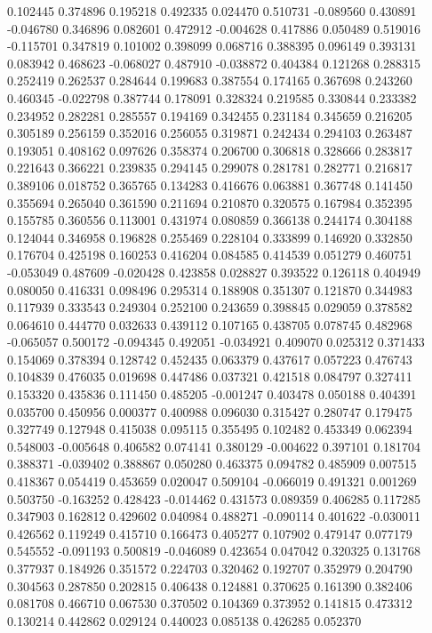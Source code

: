 0.102445
0.374896
0.195218
0.492335
0.024470
0.510731
-0.089560
0.430891
-0.046780
0.346896
0.082601
0.472912
-0.004628
0.417886
0.050489
0.519016
-0.115701
0.347819
0.101002
0.398099
0.068716
0.388395
0.096149
0.393131
0.083942
0.468623
-0.068027
0.487910
-0.038872
0.404384
0.121268
0.288315
0.252419
0.262537
0.284644
0.199683
0.387554
0.174165
0.367698
0.243260
0.460345
-0.022798
0.387744
0.178091
0.328324
0.219585
0.330844
0.233382
0.234952
0.282281
0.285557
0.194169
0.342455
0.231184
0.345659
0.216205
0.305189
0.256159
0.352016
0.256055
0.319871
0.242434
0.294103
0.263487
0.193051
0.408162
0.097626
0.358374
0.206700
0.306818
0.328666
0.283817
0.221643
0.366221
0.239835
0.294145
0.299078
0.281781
0.282771
0.216817
0.389106
0.018752
0.365765
0.134283
0.416676
0.063881
0.367748
0.141450
0.355694
0.265040
0.361590
0.211694
0.210870
0.320575
0.167984
0.352395
0.155785
0.360556
0.113001
0.431974
0.080859
0.366138
0.244174
0.304188
0.124044
0.346958
0.196828
0.255469
0.228104
0.333899
0.146920
0.332850
0.176704
0.425198
0.160253
0.416204
0.084585
0.414539
0.051279
0.460751
-0.053049
0.487609
-0.020428
0.423858
0.028827
0.393522
0.126118
0.404949
0.080050
0.416331
0.098496
0.295314
0.188908
0.351307
0.121870
0.344983
0.117939
0.333543
0.249304
0.252100
0.243659
0.398845
0.029059
0.378582
0.064610
0.444770
0.032633
0.439112
0.107165
0.438705
0.078745
0.482968
-0.065057
0.500172
-0.094345
0.492051
-0.034921
0.409070
0.025312
0.371433
0.154069
0.378394
0.128742
0.452435
0.063379
0.437617
0.057223
0.476743
0.104839
0.476035
0.019698
0.447486
0.037321
0.421518
0.084797
0.327411
0.153320
0.435836
0.111450
0.485205
-0.001247
0.403478
0.050188
0.404391
0.035700
0.450956
0.000377
0.400988
0.096030
0.315427
0.280747
0.179475
0.327749
0.127948
0.415038
0.095115
0.355495
0.102482
0.453349
0.062394
0.548003
-0.005648
0.406582
0.074141
0.380129
-0.004622
0.397101
0.181704
0.388371
-0.039402
0.388867
0.050280
0.463375
0.094782
0.485909
0.007515
0.418367
0.054419
0.453659
0.020047
0.509104
-0.066019
0.491321
0.001269
0.503750
-0.163252
0.428423
-0.014462
0.431573
0.089359
0.406285
0.117285
0.347903
0.162812
0.429602
0.040984
0.488271
-0.090114
0.401622
-0.030011
0.426562
0.119249
0.415710
0.166473
0.405277
0.107902
0.479147
0.077179
0.545552
-0.091193
0.500819
-0.046089
0.423654
0.047042
0.320325
0.131768
0.377937
0.184926
0.351572
0.224703
0.320462
0.192707
0.352979
0.204790
0.304563
0.287850
0.202815
0.406438
0.124881
0.370625
0.161390
0.382406
0.081708
0.466710
0.067530
0.370502
0.104369
0.373952
0.141815
0.473312
0.130214
0.442862
0.029124
0.440023
0.085138
0.426285
0.052370
